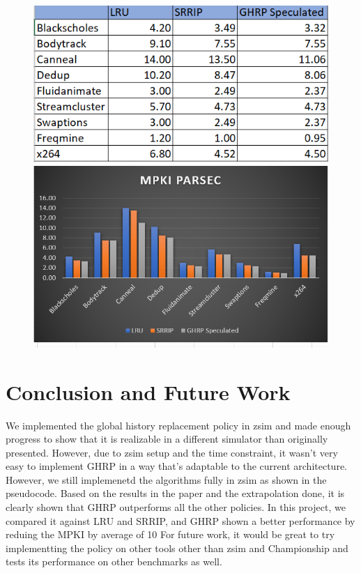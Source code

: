 \documentclass[11pt]{article}
\begin{document}
\begin{figure}[h]
	\includegraphics[width=1\textwidth]{MPKI1.PNG}
	\includegraphics[width=1\textwidth]{MPKI2.PNG}
\end{figure}

\section{Conclusion and Future Work}
We implemented the global history replacement policy in zsim and made enough progress to show that it is realizable in a different simulator than originally presented. However, due to zsim setup and the time constraint, it wasn't very easy to implement GHRP in a way that's adaptable to the current architecture. However, we still implemenetd the algorithms fully in zsim as shown in the pseudocode. 
Based on the results in the paper and the extrapolation done, it is clearly shown that GHRP outperforms all the other policies. In this project, we compared it against LRU and SRRIP, and GHRP shown a better performance by reduing the MPKI by average of 10%
For future work, it would be great to try implementting the policy on other tools other than zsim and Championship and tests its performance on other benchmarks as well. 

{%
	
	
	}
\end{document}
